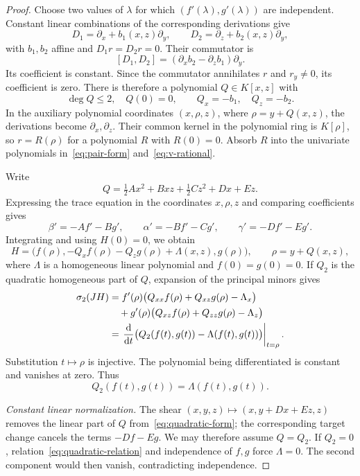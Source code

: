 \documentclass[11pt,reqno]{amsart}
\theoremstyle{definition}
\theoremstyle{remark}
\numberwithin{equation}{section}
\newcommand{\dd}{\mathrm d}
\begin{document}
\begin{proof}
Choose two values of $\lambda$ for which $(f'(\lambda),g'(\lambda))$ are independent. Constant linear combinations of the corresponding derivations give
\[
 D_1=\partial_x+b_1(x,z)\partial_y,\qquad
 D_2=\partial_z+b_2(x,z)\partial_y,
\]
with $b_1,b_2$ affine and $D_1r=D_2r=0$. Their commutator is
\[
 [D_1,D_2]=(\partial_xb_2-\partial_zb_1)\partial_y.
\]
Its coefficient is constant. Since the commutator annihilates $r$ and $r_y\neq0$, its coefficient is zero. There is therefore a polynomial $Q\in K[x,z]$ with
\[
 \deg Q\leq2,\quad Q(0)=0,\qquad Q_x=-b_1,\quad Q_z=-b_2.
\]
In the auxiliary polynomial coordinates $(x,\rho,z)$, where $\rho=y+Q(x,z)$, the derivations become $\partial_x,\partial_z$. Their common kernel in the polynomial ring is $K[\rho]$, so $r=R(\rho)$ for a polynomial $R$ with $R(0)=0$. Absorb $R$ into the univariate polynomials in~\eqref{eq:pair-form} and~\eqref{eq:v-rational}.

Write
\[
 Q=\tfrac12Ax^2+Bxz+\tfrac12Cz^2+Dx+Ez.
\]
Expressing the trace equation in the coordinates $x,\rho,z$ and comparing coefficients gives
\[
 \beta'=-Af'-Bg',\qquad \alpha'=-Bf'-Cg',\qquad \gamma'=-Df'-Eg'.
\]
Integrating and using $H(0)=0$, we obtain
\begin{equation}\label{eq:quadratic-form}
 H=\bigl(f(\rho),-Q_xf(\rho)-Q_zg(\rho)+\Lambda(x,z),g(\rho)\bigr),
 \qquad \rho=y+Q(x,z),
\end{equation}
where $\Lambda$ is a homogeneous linear polynomial and $f(0)=g(0)=0$. If $Q_2$ is the quadratic homogeneous part of $Q$, expansion of the principal minors gives
\begin{align}\label{eq:quadratic-relation-derivative}
 \sigma_2(JH)
 &=f'(\rho)\bigl(Q_{xx}f(\rho)+Q_{xz}g(\rho)-\Lambda_x\bigr)\notag\\
 &\quad+g'(\rho)\bigl(Q_{xz}f(\rho)+Q_{zz}g(\rho)-\Lambda_z\bigr)\\
 &=\left.\frac{\dd}{\dd t}
 \bigl(Q_2(f(t),g(t))-\Lambda(f(t),g(t))\bigr)\right|_{t=\rho}.\notag
\end{align}
Substitution $t\mapsto \rho$ is injective. The polynomial being differentiated is constant and vanishes at zero. Thus
\begin{equation}\label{eq:quadratic-relation}
 Q_2(f(t),g(t))=\Lambda(f(t),g(t)).
\end{equation}

\smallskip\noindent\emph{Constant linear normalization.}
The shear $(x,y,z)\mapsto(x,y+Dx+Ez,z)$ removes the linear part of $Q$ from~\eqref{eq:quadratic-form}; the corresponding target change cancels the terms $-Df-Eg$. We may therefore assume $Q=Q_2$. If $Q_2=0$, relation~\eqref{eq:quadratic-relation} and independence of $f,g$ force $\Lambda=0$. The second component would then vanish, contradicting independence.


\end{proof}
\end{document}
